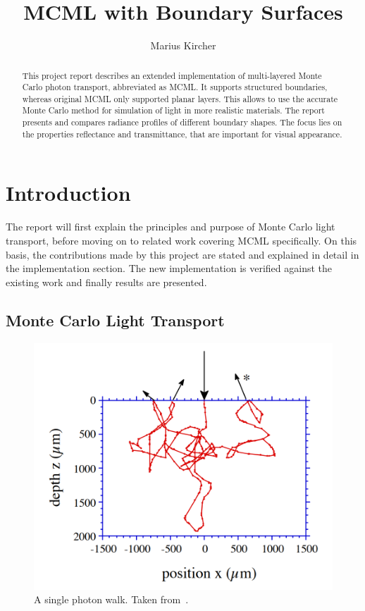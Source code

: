 \documentclass[]{article}
\title{MCML with Boundary Surfaces}
\author{Marius Kircher}
\begin{document}
\maketitle

\begin{abstract}
	This project report describes an extended implementation of multi-layered Monte Carlo photon transport\cite{wang1992monte}, abbreviated as MCML. It supports structured boundaries, whereas original MCML only supported planar layers. This allows to use the accurate Monte Carlo method for simulation of light in more realistic materials. The report presents and compares radiance profiles of different boundary shapes. The focus lies on the properties reflectance and transmittance, that are important for visual appearance.
\end{abstract}

\section{Introduction}

The report will first explain the principles and purpose of Monte Carlo light transport, before moving on to related work covering MCML specifically. On this basis, the contributions made by this project are stated and explained in detail in the implementation section. The new implementation is verified against the existing work and finally results are presented.

\subsection{Monte Carlo Light Transport}

\begin{figure}[ht!]
	\includegraphics[width=\linewidth]{img/trajectory.png}
	\caption{A single photon walk. Taken from~\cite{wang1992monte}.}
	\label{trajectory}
\end{figure}
\end{document}
